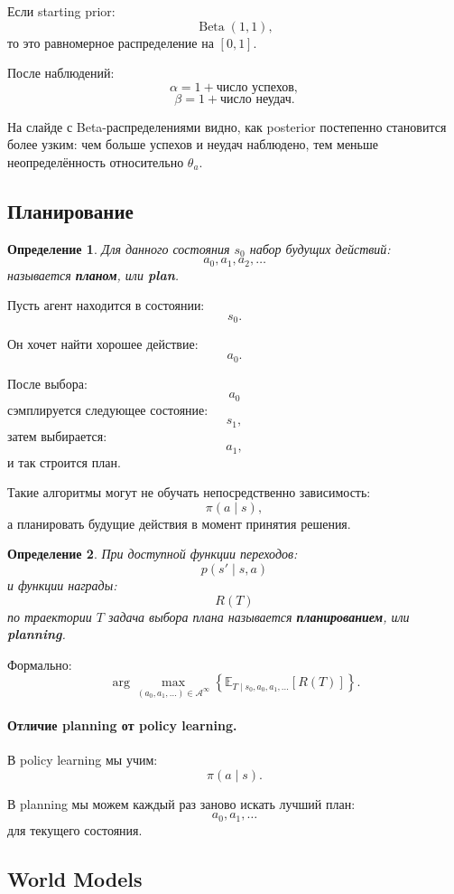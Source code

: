 \documentclass[12pt,a4paper]{article}
\newtheorem{definition}{Определение}
\begin{document}
Если starting prior:
\[
\operatorname{Beta}(1,1),
\]
то это равномерное распределение на $[0,1]$.

После наблюдений:
\[
\alpha=1+\text{число успехов},
\]
\[
\beta=1+\text{число неудач}.
\]

На слайде с Beta-распределениями видно, как posterior постепенно становится более узким: чем больше успехов и неудач наблюдено, тем меньше неопределённость относительно $\theta_a$.

\subsection{Планирование}

\begin{definition}
Для данного состояния $s_0$ набор будущих действий:
\[
a_0,a_1,a_2,\ldots
\]
называется \textbf{планом}, или \textbf{plan}.
\end{definition}

Пусть агент находится в состоянии:
\[
s_0.
\]

Он хочет найти хорошее действие:
\[
a_0.
\]

После выбора:
\[
a_0
\]
сэмплируется следующее состояние:
\[
s_1,
\]
затем выбирается:
\[
a_1,
\]
и так строится план.

Такие алгоритмы могут не обучать непосредственно зависимость:
\[
\pi(a\mid s),
\]
а планировать будущие действия в момент принятия решения.

\begin{definition}
При доступной функции переходов:
\[
p(s'\mid s,a)
\]
и функции награды:
\[
R(T)
\]
по траектории $T$ задача выбора плана называется \textbf{планированием}, или \textbf{planning}.
\end{definition}

Формально:
\[
\arg\max_{(a_0,a_1,\ldots)\in \mathcal A^\infty}
\left\{
\mathbb E_{T\mid s_0,a_0,a_1,\ldots}
\left[
R(T)
\right]
\right\}.
\]

\paragraph{Отличие planning от policy learning.}

В policy learning мы учим:
\[
\pi(a\mid s).
\]

В planning мы можем каждый раз заново искать лучший план:
\[
a_0,a_1,\ldots
\]
для текущего состояния.

\subsection{World Models}
\end{document}
